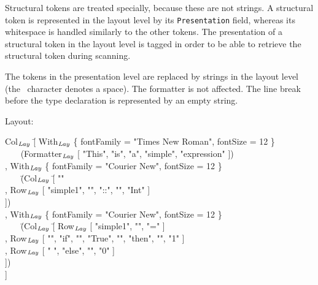 \documentclass{speauth}
\begin{document}
Structural tokens are treated specially, because these are not strings. A structural token is represented in the layout level by its {\tt Presentation} field, whereas its whitespace is handled similarly to the other tokens. The presentation of a structural token in the layout level is tagged in order to be able to retrieve the structural token during scanning.



 The tokens in the presentation level are replaced by strings in the layout level (the \textvisiblespace~character denotes a space). The formatter is not affected. The line break before the type declaration is represented by an empty string. 

Layout:
\small \ttfamily
\begin{tabbing}
Col$_{\mathit{Lay}}$ \= [  With$_{\mathit{Lay}}$ \{ fontFamily = "Times New Roman", fontSize = 12 \}\\
                    \>  ~~~ (Formatter$_{\mathit{Lay}}$ [ "This", "is", "a", "simple", "expression" ])\\
                    \> , With$_{\mathit{Lay}}$ \{ fontFamily = "Courier New",  fontSize = 12 \}\\
                    \>  ~~~ \= (Col$_{\mathit{Lay}}$ \= [ "" \\
                    \>          \>        \> , Row$_{\mathit{Lay}}$ [ "simple1", "\textvisiblespace", "::",
                                                                           "\textvisiblespace", "Int" ]\\
                    \>          \>        \> ])\\
                    \> , With$_{\mathit{Lay}}$ \{ fontFamily = "Courier New",  fontSize = 12 \}\\
                    \>  ~~~ \= (Col$_{\mathit{Lay}}$ \= [ Row$_{\mathit{Lay}}$ [ "simple1", "\textvisiblespace", "=" ]\\
                    \>          \>        \> , Row$_{\mathit{Lay}}$  [ "\textvisiblespace\textvisiblespace", 
                                                                             "if", "\textvisiblespace", "True", "\textvisiblespace", 
                                                                             "then", "\textvisiblespace", "1" ]\\
                    \>          \>        \> , Row$_{\mathit{Lay}}$ [ "\textvisiblespace\textvisiblespace\textvisiblespace
                                                                             \textvisiblespace\textvisiblespace\textvisiblespace
                                                                             \textvisiblespace\textvisiblespace\textvisiblespace                                                                                         \textvisiblespace ", "else", "\textvisiblespace", "0" ]\\
                    \>          \>        \> ])\\
                    \> ]
\end{tabbing}
\rmfamily \normalsize
\end{document}
